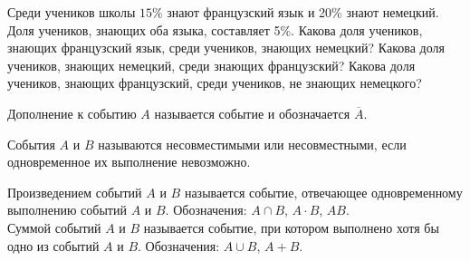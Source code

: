 \documentclass[a4paper,12pt]{article}
\begin{document}
\def\exec{\makebox[25pt]{\put(-5,3){\line(0,1){3}}\put(-5,3){\vector(1,0){11}}}}
\def\вып{\makebox[22pt]{\put(-5,3){\line(0,1){3}}\put(-5,3){\vector(1,0){11}}}}


  Среди учеников школы $15\%$ знают французский язык и 20\% знают немецкий. Доля учеников, знающих оба языка, составляет 5\%.
   Какова доля учеников, знающих французский язык, среди учеников, знающих немецкий?  Какова доля учеников, знающих немецкий, среди знающих французский?  Какова доля учеников, знающих французский, среди учеников,  не знающих немецкого?

  Дополнение к событию $A$ называется событие  и обозначается $\overline{A}$.

  События $A$ и $B$ называются  несовместимыми или  несовместными, если одновременное их выполнение невозможно.

   Произведением событий $A$ и $B$ называется событие, отвечающее одновременному выполнению событий $A$ и $B$. Обозначения: $A\cap B$, $A\cdot B$, $AB$.\\
   Суммой событий $A$ и $B$ называется событие, при котором выполнено хотя бы одно из событий $A$ и $B$. Обозначения: $A\cup B$, $A+B$.
\end{document}
